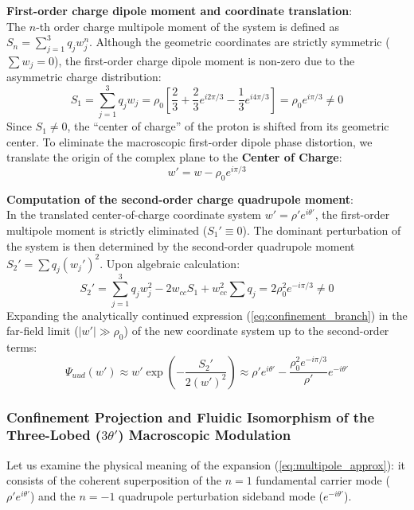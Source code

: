 \documentclass[12pt, a4paper]{article}
\begin{document}
\textbf{First-order charge dipole moment and coordinate translation}: \\
The $n$-th order charge multipole moment of the system is defined as $S_n = \sum_{j=1}^3 q_j w_j^n$. Although the geometric coordinates are strictly symmetric ($\sum w_j = 0$), the first-order charge dipole moment is non-zero due to the asymmetric charge distribution:
\begin{equation}
S_1 = \sum_{j=1}^3 q_j w_j = \rho_0 \left[ \frac{2}{3} + \frac{2}{3}e^{i2\pi/3} - \frac{1}{3}e^{i4\pi/3} \right] = \rho_0 e^{i\pi/3} \neq 0 \label{eq:s1_val}
\end{equation}
Since $S_1 \neq 0$, the ``center of charge'' of the proton is shifted from its geometric center. To eliminate the macroscopic first-order dipole phase distortion, we translate the origin of the complex plane to the \textbf{Center of Charge}:
\begin{equation}
w' = w - \rho_0 e^{i\pi/3} \label{eq:coord_translation}
\end{equation}

\textbf{Computation of the second-order charge quadrupole moment}: \\
In the translated center-of-charge coordinate system $w' = \rho' e^{i\theta'}$, the first-order multipole moment is strictly eliminated ($S_1' \equiv 0$). The dominant perturbation of the system is then determined by the second-order quadrupole moment $S_2' = \sum q_j (w_j')^2$. Upon algebraic calculation:
\begin{equation}
S_2' = \sum_{j=1}^3 q_j w_j^2 - 2w_{cc} S_1 + w_{cc}^2 \sum q_j = 2\rho_0^2 e^{-i\pi/3} \neq 0 \label{eq:quadrupole_val}
\end{equation}
Expanding the analytically continued expression (\ref{eq:confinement_branch}) in the far-field limit ($|w'| \gg \rho_0$) of the new coordinate system up to the second-order terms:
\begin{equation}
\Psi_{uud}(w') \approx w' \exp\left( -\frac{S_2'}{2 (w')^2} \right) \approx \rho' e^{i\theta'} - \frac{\rho_0^2 e^{-i\pi/3}}{\rho'} e^{-i\theta'} \label{eq:multipole_approx}
\end{equation}

\subsubsection{Confinement Projection and Fluidic Isomorphism of the Three-Lobed ($3\theta'$) Macroscopic Modulation}

Let us examine the physical meaning of the expansion (\ref{eq:multipole_approx}): it consists of the coherent superposition of the $n=1$ fundamental carrier mode ($\rho' e^{i\theta'}$) and the $n=-1$ quadrupole perturbation sideband mode ($e^{-i\theta'}$).
\end{document}
